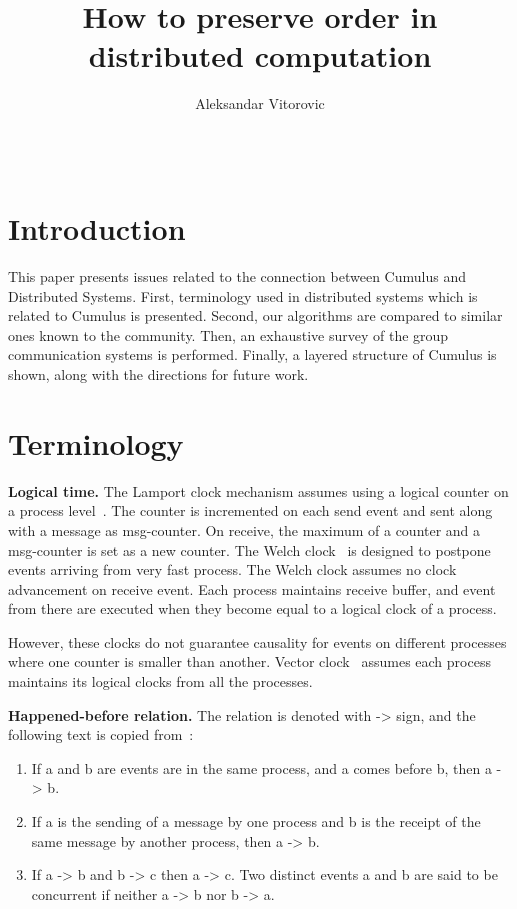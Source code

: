 \documentclass{sig-semester}
\title{How to preserve order in distributed computation}
\author{\alignauthor Aleksandar Vitorovic \\[1ex]
\affaddr{Dept.\ of Computer Science} \\
\affaddr{EPFL} \\
\affaddr{aleksandar.vitorovic@epfl.ch}
}
\begin{document}
\maketitle



\section{Introduction}
\vspace{2mm}
This paper presents issues related to the connection between Cumulus and Distributed Systems. First, terminology used in distributed systems which is related to Cumulus is presented. Second, our algorithms are compared to similar ones known to the community. Then, an exhaustive survey of the group communication systems is performed. Finally, a layered structure of Cumulus is shown, along with the directions for future work.

\section{Terminology}
\vspace{2mm}
\textbf{Logical time.} The Lamport clock mechanism assumes using a logical counter on a process level~\cite{Lamport78}. The counter is incremented on each send event and sent along with a message as msg-counter. On receive, the maximum of a counter and a msg-counter is set as a new counter. The Welch clock~\cite{Welch87} is designed to postpone events arriving from very fast process. The Welch clock assumes no clock advancement on receive event. Each process maintains receive buffer, and event from there are executed when they become equal to a logical clock of a process. 

However, these clocks do not guarantee causality for events on different processes where one counter is smaller than another. Vector clock~\cite{Fidge88, Lamport78} assumes each process maintains its logical clocks from all the processes.

\textbf{Happened-before relation.} The relation is denoted with -> sign, and the following text is copied from~\cite{Lamport78}:
\begin{enumerate}[(1)]
 \item If a and b are events are in the same process, and a comes before b, then a -> b.
 \item If a is the sending of a message by one process and b is the receipt of the same message by another process, then a -> b.
 \item If a -> b and b -> c then a -> c. Two distinct events a and b are said to be concurrent if neither a -> b nor b -> a.
\end{enumerate}
\end{document}
